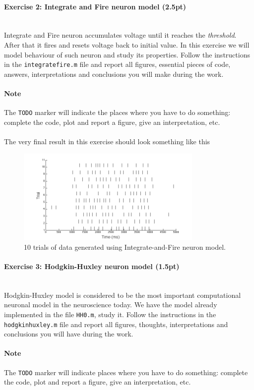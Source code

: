 \documentclass[a4paper,11pt]{article}
\newenvironment{exercise}[3]{\paragraph{Exercise #1: #2 (#3pt)}\ \\}{
\medskip}
\begin{document}
%
%
\begin{exercise}{2}{Integrate and Fire neuron model}{2.5}
Integrate and Fire neuron accumulates voltage until it reaches the \emph{threshold}. After that it fires and resets voltage back to initial value. In this exercise we will model behaviour of such neuron and study its properties. Follow the instructions in the \texttt{integratefire.m} file and report all figures, essential pieces of code, answers, interpretations and conclusions you will make during the work.

\paragraph{Note} The \texttt{TODO} marker will indicate the places where you have to do something: complete the code, plot and report a figure, give an interpretation, etc.\\
\ \\
The very final result in this exercise should look something like this
\begin{figure}[H]
   \centering
   \includegraphics[width=0.8\textwidth]{raster_plot.png} 
   \caption{10 trials of data generated using Integrate-and-Fire neuron model.}
   \label{fig:rasterplot}
\end{figure}
\end{exercise}


%
%
\begin{exercise}{3}{Hodgkin-Huxley neuron model}{1.5}
Hodgkin-Huxley model is considered to be the most important computational neuronal model in the neuroscience today. We have the model already implemented in the file \texttt{HH0.m}, study it. Follow the instructions in the \texttt{hodgkinhuxley.m} file and report all figures, thoughts, interpretations and conclusions you will have during the work.

\paragraph{Note} The \texttt{TODO} marker will indicate places where you have to do something: complete the code, plot and report a figure, give an interpretation, etc.
\end{exercise}
\end{document}

